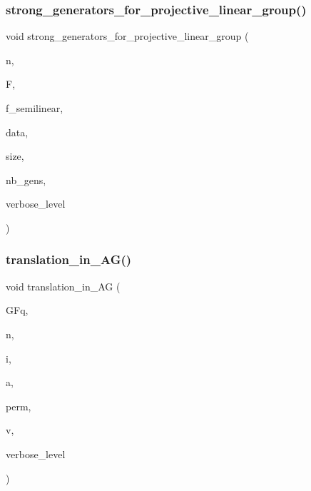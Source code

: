 \subsubsection{\texorpdfstring{strong\+\_\+generators\+\_\+for\+\_\+projective\+\_\+linear\+\_\+group()}{strong\_generators\_for\_projective\_linear\_group()}}
{\footnotesize\ttfamily void strong\+\_\+generators\+\_\+for\+\_\+projective\+\_\+linear\+\_\+group (\begin{DoxyParamCaption}\item[{\mbox{\hyperlink{galois_8h_a09fddde158a3a20bd2dcadb609de11dc}{I\+NT}}}]{n,  }\item[{\mbox{\hyperlink{classfinite__field}{finite\+\_\+field}} $\ast$}]{F,  }\item[{\mbox{\hyperlink{galois_8h_a09fddde158a3a20bd2dcadb609de11dc}{I\+NT}}}]{f\+\_\+semilinear,  }\item[{\mbox{\hyperlink{galois_8h_a09fddde158a3a20bd2dcadb609de11dc}{I\+NT}} $\ast$\&}]{data,  }\item[{\mbox{\hyperlink{galois_8h_a09fddde158a3a20bd2dcadb609de11dc}{I\+NT}} \&}]{size,  }\item[{\mbox{\hyperlink{galois_8h_a09fddde158a3a20bd2dcadb609de11dc}{I\+NT}} \&}]{nb\+\_\+gens,  }\item[{\mbox{\hyperlink{galois_8h_a09fddde158a3a20bd2dcadb609de11dc}{I\+NT}}}]{verbose\+\_\+level }\end{DoxyParamCaption})}

\mbox{\label{group__generators_8_c_a2dc31e911a639d9be60389fae43e8ebc}} 
\subsubsection{\texorpdfstring{translation\+\_\+in\+\_\+\+A\+G()}{translation\_in\_AG()}}
{\footnotesize\ttfamily void translation\+\_\+in\+\_\+\+AG (\begin{DoxyParamCaption}\item[{\mbox{\hyperlink{classfinite__field}{finite\+\_\+field}} \&}]{G\+Fq,  }\item[{\mbox{\hyperlink{galois_8h_a09fddde158a3a20bd2dcadb609de11dc}{I\+NT}}}]{n,  }\item[{\mbox{\hyperlink{galois_8h_a09fddde158a3a20bd2dcadb609de11dc}{I\+NT}}}]{i,  }\item[{\mbox{\hyperlink{galois_8h_a09fddde158a3a20bd2dcadb609de11dc}{I\+NT}}}]{a,  }\item[{\mbox{\hyperlink{galois_8h_a09fddde158a3a20bd2dcadb609de11dc}{I\+NT}} $\ast$}]{perm,  }\item[{\mbox{\hyperlink{galois_8h_a09fddde158a3a20bd2dcadb609de11dc}{I\+NT}} $\ast$}]{v,  }\item[{\mbox{\hyperlink{galois_8h_a09fddde158a3a20bd2dcadb609de11dc}{I\+NT}}}]{verbose\+\_\+level }\end{DoxyParamCaption})}

